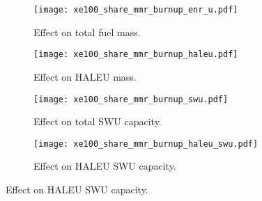 \begin{figure}
    \begin{subfigure}[t]{0.48\textwidth}
        \centering
        \texttt{[image: xe100\_share\_mmr\_burnup\_enr\_u.pdf]}
        \caption{Effect on total fuel mass.}
        \label{fig:xe100_share_mmr_burnup_enr_u}
    \end{subfigure}
    \hfill
    \begin{subfigure}[t]{0.48\textwidth}
        \centering
        \texttt{[image: xe100\_share\_mmr\_burnup\_haleu.pdf]}
        \caption{Effect on HALEU mass.}
        \label{fig:xe100_share_mmr_burnup_haleu}
    \end{subfigure}
    
    \begin{subfigure}[t]{0.48\textwidth}
        \centering
        \texttt{[image: xe100\_share\_mmr\_burnup\_swu.pdf]}
        \caption{Effect on total SWU capacity.}
        \label{fig:xe100_share_mmr_burnup_swu}
    \end{subfigure}
    \hfill
    \begin{subfigure}[t]{0.48\textwidth}
        \centering
        \texttt{[image: xe100\_share\_mmr\_burnup\_haleu\_swu.pdf]}
        \caption{Effect on HALEU SWU capacity.}
        \label{fig:xe100_share_mmr_burnup_haleu_swu}
    \end{subfigure}    
\end{figure}

